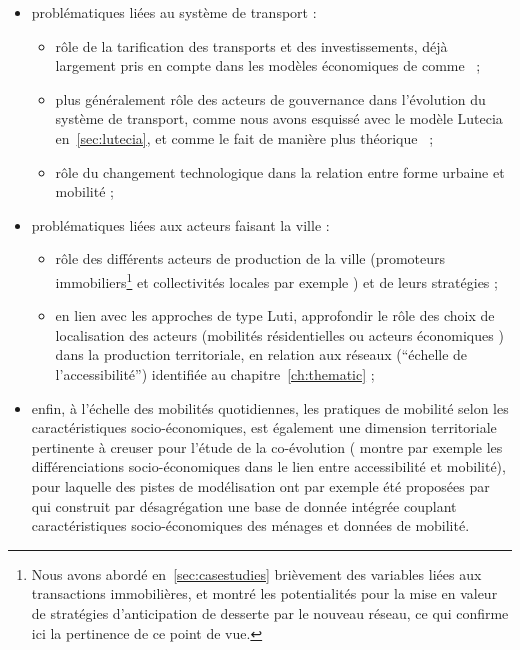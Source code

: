 \begin{itemize}
	\item problématiques liées au système de transport :
	\begin{itemize}
	\item rôle de la tarification des transports et des investissements, déjà largement pris en compte dans les modèles économiques de  comme~\cite{levinson2007co} ;
	\item plus généralement rôle des acteurs de gouvernance dans l'évolution du système de transport, comme nous avons esquissé avec le modèle Lutecia en~\ref{sec:lutecia}, et comme le fait de manière plus théorique~\cite{Xie2011} ;
	\item rôle du changement technologique dans la relation entre forme urbaine et mobilité \cite{brotchie1984technological} ;
	\end{itemize}
	\item problématiques liées aux acteurs faisant la ville :
	\begin{itemize}
	\item rôle des différents acteurs de production de la ville (promoteurs immobiliers\footnote{Nous avons abordé en~\ref{sec:casestudies} brièvement des variables liées aux transactions immobilières, et montré les potentialités pour la mise en valeur de stratégies d'anticipation de desserte par le nouveau réseau, ce qui confirme ici la pertinence de ce point de vue.} et collectivités locales par exemple \cite{le2010acteurs}) et de leurs stratégies ;
	\item en lien avec les approches de type Luti, approfondir le rôle des choix de localisation des acteurs (mobilités résidentielles ou acteurs économiques \cite{tannier2003trois}) dans la production territoriale, en relation aux réseaux (``échelle de l'accessibilité'') identifiée au chapitre~\ref{ch:thematic} ;
	\end{itemize}
	\item enfin, à l'échelle des mobilités quotidiennes, les pratiques de mobilité selon les caractéristiques socio-économiques, est également une dimension territoriale pertinente à creuser pour l'étude de la co-évolution (\cite{cerqueira2017inegalites} montre par exemple les différenciations socio-économiques dans le lien entre accessibilité et mobilité), pour laquelle des pistes de modélisation ont par exemple été proposées par~\cite{morency2005contributions} qui construit par désagrégation une base de donnée intégrée couplant caractéristiques socio-économiques des ménages et données de mobilité.
\end{itemize}


